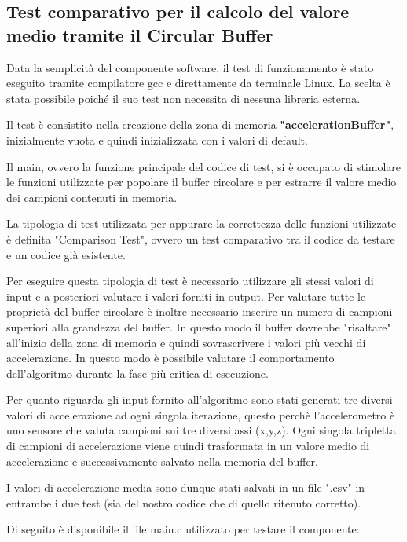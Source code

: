 \documentclass[LaM,binding=0.6cm]{../sapthesis}
\begin{document}
\subsection{Test comparativo per il calcolo del valore medio tramite il Circular Buffer}

Data la semplicità del componente software, il test di funzionamento è stato eseguito tramite compilatore gcc e direttamente da terminale Linux. La scelta è stata possibile poiché il suo test non necessita di nessuna libreria esterna.

Il test è consistito nella creazione della zona di memoria \textbf{"accelerationBuffer"}, inizialmente vuota e quindi inizializzata con i valori di default.

Il main, ovvero la funzione principale del codice di test, si è occupato di stimolare le funzioni utilizzate per popolare il buffer circolare e per estrarre il valore medio dei campioni contenuti in memoria.

La tipologia di test utilizzata per appurare la correttezza delle funzioni utilizzate è definita "Comparison Test", ovvero un test comparativo tra il codice da testare e un codice già esistente.

Per eseguire questa tipologia di test è necessario utilizzare gli stessi valori di input e a posteriori valutare i valori forniti in output. Per valutare tutte le proprietà del buffer circolare è inoltre necessario inserire un numero di campioni superiori alla grandezza del buffer. In questo modo il buffer dovrebbe "risaltare" all'inizio della zona di memoria e quindi sovrascrivere i valori più vecchi di accelerazione. In questo modo è possibile valutare il comportamento dell'algoritmo durante la fase più critica di esecuzione.

Per quanto riguarda gli input fornito all'algoritmo sono stati generati tre diversi valori di accelerazione ad ogni singola iterazione, questo perchè l'accelerometro è uno sensore che valuta campioni sui tre diversi assi (x,y,z).
Ogni singola tripletta di campioni di accelerazione viene quindi trasformata in un valore medio di accelerazione e successivamente salvato nella memoria del buffer.

I valori di accelerazione media sono dunque stati salvati in un file ".csv" in entrambe i due test (sia del nostro codice che di quello ritenuto corretto).

Di seguito è disponibile il file main.c utilizzato per testare il componente:
\end{document}
